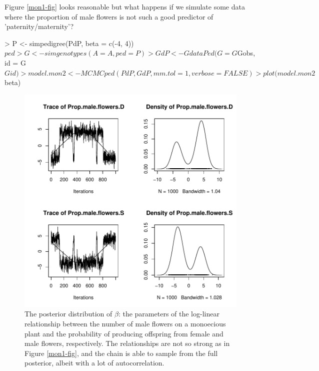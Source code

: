 \documentclass{article}
\begin{document}
Figure \ref{mon1-fig} looks reasonable but what happens if we simulate some data where the proportion of male flowers is not such a good predictor of 'paternity/maternity'?  

\begin{Schunk}
\begin{Sinput}
> P <- simpedigree(PdP, beta = c(-4, 4))$ped
> G <- simgenotypes(A = A, ped = P)
> GdP <- GdataPed(G = G$Gobs, id = G$Gid)
> model.mon2 <- MCMCped(PdP, GdP, mm.tol = 1, verbose = FALSE)
> plot(model.mon2$beta)
\end{Sinput}
\end{Schunk}


\begin{figure}[!h]
\begin{center}
\includegraphics{Tutorial-107}
\end{center}
\caption{The posterior distribution of $\beta$: the parameters of the log-linear relationship between the number of male flowers on a monoecious plant and the probability of producing offspring from female and male flowers, respectively. The relationships are not so strong as in Figure \ref{mon1-fig}, and the chain is able to sample from the full posterior, albeit with a lot of autocorrelation.}
\label{mon2-fig}
\end{figure}
\end{document}
